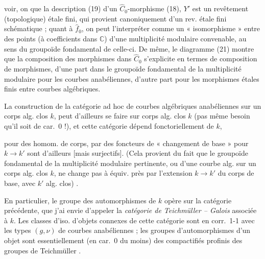\documentclass[11pt,a4paper]{article}
\begin{document}
voir, on  que  la description (19) d'un $\widehat{C}_{0}$-morphisme (18), $Y'$ est un revêtement (topologique) étale fini, qui provient canoniquement d'un rev. étale fini schématique ; quant à $\hat{f}_{0}$, on peut l'interpréter comme un « isomorphisme »  \struck{\ill{}} entre des points (à coefficients dans $\mathbb{C}$) d'une multiplicité modulaire convenable, au sens du groupoïde fondamental de celle-ci. De même, le diagramme (21) montre que la composition des morphismes dans $\widehat{C}_{0}$ s'explicite en termes de composition de morphismes, d'une part dans le groupoïde fondamental de la multiplicité modulaire pour les courbes anabéliennes, d'autre part pour les morphismes étales finis entre courbes algébriques.

La construction de la catégorie  ad hoc de courbes algébriques anabéliennes sur un corps alg. clos $k$, peut d'ailleurs se faire sur  corps alg. clos $k$ (pas même besoin qu'il soit de car.~0 !), et cette catégorie dépend fonctoriellement de $k$,


pour des homom. de corps, par des foncteurs de « changement de base » pour $k\to k'$ \ill{} sont d'ailleurs   [mais  surjectifs]. (Cela provient du fait que le groupoïde fondamental de la multiplicité modulaire pertinente, ou d'une courbe alg. sur un corps alg. clos $k$, ne change pas à équiv. près par l'extension $k\to k'$ du corps de base, avec $k'$ alg. clos)  .

En particulier, le groupe des automorphismes de $k$ opère sur la catégorie précédente, que j'ai envie d'appeler la \emph{catégorie de Teichmüller -- Galois} associée à $k$. Les  classes d'iso. d'objets connexes de cette catégorie sont en corr.~1-1 avec les types $(g,\nu)$ de courbes anabéliennes ; les groupes d'automorphismes d'un objet sont essentiellement (en car.~0 du moins) des compactifiés profinis des groupes de Teichmüller .
\end{document}

